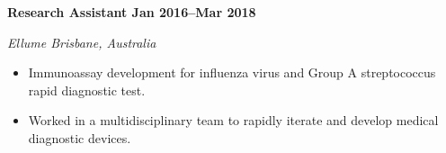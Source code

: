 \textbf{Research Assistant \hfill Jan 2016--Mar 2018}\par
\textit{Ellume \hfill Brisbane, Australia}\par
\begin{itemize}
	\item Immunoassay development for influenza virus and Group A streptococcus rapid diagnostic test.
	\item Worked in a multidisciplinary team to rapidly iterate and develop medical diagnostic devices.
\end{itemize}\par